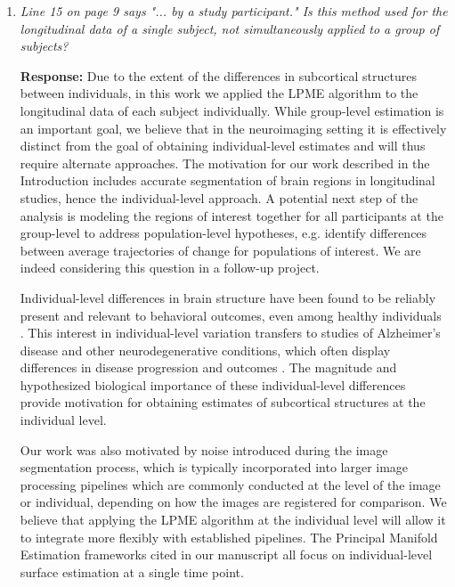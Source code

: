 \documentclass[12pt]{article}
\theoremstyle{definition}
\newcommand{\revision}[1]{\textcolor{blue}{#1}}
\begin{document}
\begin{enumerate}
\revision{However, this approach assumes that the progression trajectory for each subject must be parallel to a straight reference trajectory in some latent space, which while appropriate in many applications, may be overly restrictive in the case of heterogeneous conditions like AD.}

\item \textit{Line 15 on page 9 says "... by a study participant." Is this method used for the longitudinal data of a single subject, not simultaneously applied to a group of subjects?}

{\bf Response:} Due to the extent of the differences in subcortical structures between individuals, in this work we applied the LPME algorithm to the longitudinal data of each subject individually. While group-level estimation is an important goal, we believe that in the neuroimaging setting it is effectively distinct from the goal of obtaining individual-level estimates and will thus require alternate approaches. The motivation for our work described in the Introduction includes accurate segmentation of brain regions in longitudinal studies, hence the individual-level approach. A potential next step of the analysis is modeling the regions of interest together for all participants at the group-level to address population-level hypotheses, e.g. identify differences between average trajectories of change for populations of interest. We are indeed considering this question in a follow-up project. 

Individual-level differences in brain structure have been found to be reliably present and relevant to behavioral outcomes, even among healthy individuals \citep{takao2015Brain, llera2019Interindividual}. This interest in individual-level variation transfers to studies of Alzheimer's disease and other neurodegenerative conditions, which often display differences in disease progression and outcomes \citep{vogel2021Four}. The magnitude and hypothesized biological importance of these individual-level differences provide motivation for obtaining estimates of subcortical structures at the individual level. 

Our work was also motivated by noise introduced during the image segmentation process, which is typically incorporated into larger image processing pipelines which are commonly conducted at the level of the image or individual, depending on how the images are registered for comparison. We believe that applying the LPME algorithm at the individual level will allow it to integrate more flexibly with established pipelines. The Principal Manifold Estimation frameworks cited in our manuscript all focus on individual-level surface estimation at a single time point. 


\end{enumerate}
\end{document}
